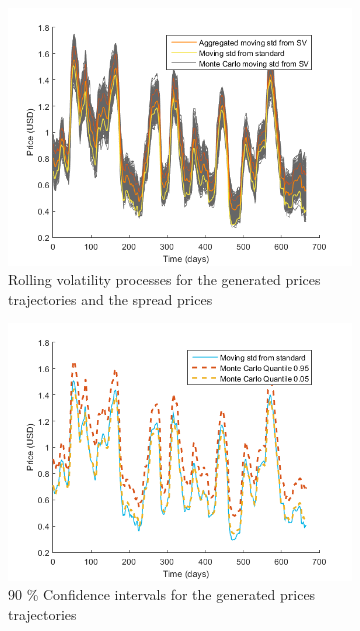 \documentclass[11pt,a4,twosided,singlespacing,titlepagenumber=on]{scrreprt}
\numberwithin{equation}{chapter} %
\theoremstyle{remark}
\begin{document}
\begin{figure}[H]
    \begin{subfigure}[t]{0.49\textwidth}
        \centering
        \includegraphics[width=1\textwidth]{model_vol/3}
        \caption{Rolling volatility processes for the generated prices trajectories and the spread prices}
        \label{vol_mod_3}
    \end{subfigure}
    \begin{subfigure}[t]{0.49\textwidth}
        \centering
        \includegraphics[width=1\textwidth]{model_vol/4}
        \caption{90 \% Confidence intervals for the generated prices trajectories}
        \label{vol_mod_4}
    \end{subfigure}
    \begin{subfigure}[t]{0.49\textwidth}

\end{subfigure}
\end{figure}
\end{document}
